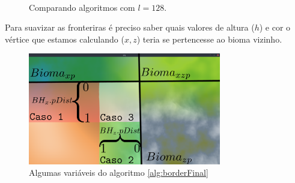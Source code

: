 \begin{figure}[H]
     \centering
     \hspace{0.1cm}
     \\
     \caption{Comparando algoritmos com $l=128$.}
     
     \label{fig:borderlenanotherauxyeahaboveonly}
\end{figure}

Para suavizar as fronteriras é preciso saber quais valores de altura ($h$) e cor o
vértice que estamos calculando ($x, z$) teria se pertencesse ao bioma vizinho.

\begin{figure}[H]
    \centering
    \includegraphics[width=0.75\textwidth]{figuras/border/yeah.png}
    \caption{Algumas variáveis do algoritmo \ref{alg:borderFinal}}
    \label{fig:paralgborder}
\end{figure}

